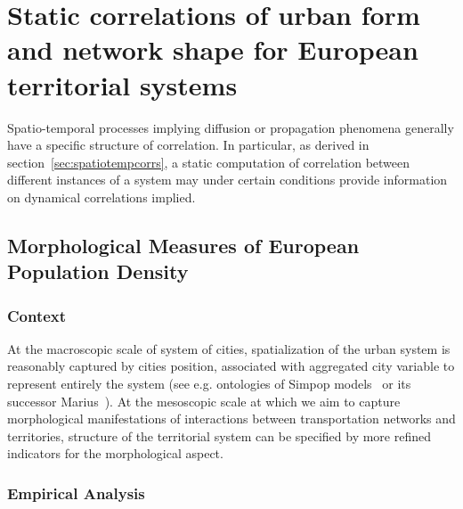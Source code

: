 
\newpage

\section{Static correlations of urban form and network shape for European territorial systems}


Spatio-temporal processes implying diffusion or propagation phenomena generally have a specific structure of correlation. In particular, as derived in section~\ref{sec:spatiotempcorrs}, a static computation of correlation between different instances of a system may under certain conditions provide information on dynamical correlations implied.




\subsection{Morphological Measures of European Population Density}

\subsubsection{Context}

At the macroscopic scale of system of cities, spatialization of the urban system is reasonably captured by cities position, associated with aggregated city variable to represent entirely the system (see e.g. ontologies of Simpop models~\cite{pumain2012multi} or its successor Marius~\cite{cottineau2014evolution}). At the mesoscopic scale at which we aim to capture morphological manifestations of interactions between transportation networks and territories, structure of the territorial system can be specified by more refined indicators for the morphological aspect. 

\subsubsection{Empirical Analysis}

